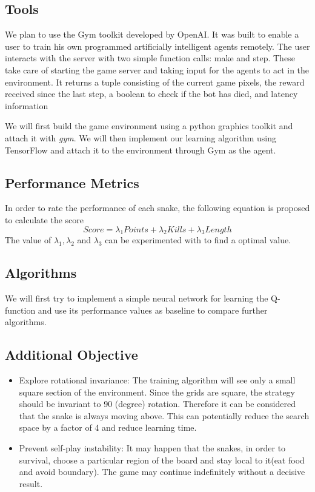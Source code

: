 \documentclass[conference]{IEEEtran}
\begin{document}
\subsection{Tools}
We plan to use the Gym toolkit developed by OpenAI\cite{n1}. It was built to enable a user to train his own programmed artificially intelligent agents remotely. The user interacts with the server with two simple function calls: make and step. These take care of starting the game server and taking input for the agents to act in the environment. It returns a tuple consisting of the current game pixels, the reward received since the last step, a boolean to check if the bot has died, and latency information
\newline\par
We will first build the game environment using a python graphics toolkit and attach it with \textit{gym}. We will then implement our learning algorithm using TensorFlow\cite{n2} and attach it to the environment through Gym as the agent. \newline\par
\subsection{Performance Metrics}
In order to rate the performance of each snake, the following equation is proposed to calculate the score
\begin{equation}
Score=\lambda_1 Points+ \lambda_2 Kills+\lambda_3Length
\end{equation}
The value of \({\lambda_1,\lambda_2}\) and \({\lambda_3}\) can be experimented with to find a optimal value.

\subsection{Algorithms}
We will first try to implement a simple neural network for learning the Q-function and use its performance values as baseline to compare further algorithms.  \newline\par
   
   
\subsection{Additional Objective}
\begin{itemize}
	\item{Explore rotational invariance: The training algorithm will see only a small square section of the environment. Since the grids are square, the strategy should be invariant to 90 (degree) rotation. Therefore it can be considered that the snake is always moving above. This can potentially reduce the search space by a factor of 4 and reduce learning time.}
	\item{Prevent self-play instability: It may happen that the snakes, in order to survival, choose a particular region of the board and stay local to it(eat food and avoid boundary). The game may continue indefinitely without a decisive result. }
\end{itemize}
\end{document}
